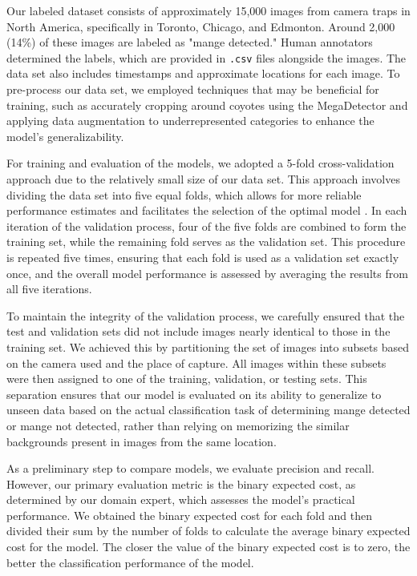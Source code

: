 \documentclass{article}
\begin{document}
Our labeled dataset consists of approximately 15,000 images from camera traps in
North America, specifically in Toronto, Chicago, and Edmonton. Around 2,000
(14\%) of these images are labeled as "mange detected." Human annotators
determined the labels, which are provided in \verb|.csv| files alongside the
images. The data set also includes timestamps and approximate locations for each
image. To pre-process our data set, we employed techniques that may be
beneficial for training, such as accurately cropping around coyotes using the
MegaDetector and applying data augmentation to underrepresented categories to
enhance the model's generalizability.

For training and evaluation of the models, we adopted a 5-fold cross-validation
approach due to the relatively small size of our data set. This approach
involves dividing the data set into five equal folds, which allows for more
reliable performance estimates and facilitates the selection of the optimal
model \cite{Berrar2019, Schaffer1993}. In each iteration of the validation
process, four of the five folds are combined to form the training set, while the
remaining fold serves as the validation set. This procedure is repeated five
times, ensuring that each fold is used as a validation set exactly once, and the
overall model performance is assessed by averaging the results from all five
iterations.

To maintain the integrity of the validation process, we carefully ensured that
the test and validation sets did not include images nearly identical to those in
the training set. We achieved this by partitioning the set of images into
subsets based on the camera used and the place of capture. All images within
these subsets were then assigned to one of the training, validation, or testing
sets. This separation ensures that our model is evaluated on its ability to
generalize to unseen data based on the actual classification task of determining
mange detected or mange not detected, rather than relying on memorizing the
similar backgrounds present in images from the same location.

As a preliminary step to compare models, we evaluate precision and recall.
However, our primary evaluation metric is the binary expected cost, as
determined by our domain expert, which assesses the model's practical
performance. We obtained the binary expected cost for each fold and then divided
their sum by the number of folds to calculate the average binary expected cost
for the model. The closer the value of the binary expected cost is to zero, the
better the classification performance of the model.
\end{document}
